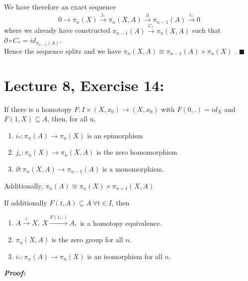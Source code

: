 \documentclass[11pt]{article}
\numberwithin{equation}{section}
\begin{document}
We have therefore an exact sequence 
$$0\rightarrow\pi_n(X)\xrightarrow{j_*}\pi_n(X,A)\xrightarrow{\partial}\pi_{n-1}(A)\xrightarrow{i_*}0 $$
where we already have constructed $\pi_{n-1}(A)\xrightarrow{C_*}\pi_n(X,A)$ such that $\partial\circ C_* = id_{\pi_{n-1}(A)}$. \\ Hence the sequence splits and we have $\pi_n(X,A)\cong \pi_{n-1}(A)\times\pi_n(X)$ .  $\blacksquare$

\section{\normalsize{Lecture 8, Exercise 14:}}
\begin{thm}
If there is a homotopy $F:I\times(X,x_0)\rightarrow (X,x_0)$ with $F(0,.)=id_X$ and $F(1,X)\subseteq A$, then, for all n,
\begin{enumerate}
	\item $i_{*}:\pi_n(A)\rightarrow \pi_n(X)$ is an epimorphism
	\item $j_{*}:\pi_n(X)\rightarrow\pi_n(X,A)$ is the zero homomorphism
	\item $\partial: \pi_n(X,A)\rightarrow \pi_{n-1}(A)$ is a monomorphism.
\end{enumerate}
Additionally, $\pi_n(A)\cong \pi_n(X)\times\pi_{n+1}(X,A)$
\end{thm}
\begin{rem}
	If additionally $F(t,A)\subseteq A\ \forall t\in I$, then 
	\begin{enumerate}
	\item $A\xrightarrow{i}X,\ X\xrightarrow{F(1,.)}A,$ is a homotopy equivalence. 
	\item $\pi_n(X,A)$ is the zero group for all $n$. 
	\item $i_{*}:\pi_n(A)\rightarrow \pi_n(X)$ is an isomorphism for all $n$. 
	\end{enumerate}
\end{rem}
\textbf{\emph{Proof:}} 
\end{document}
